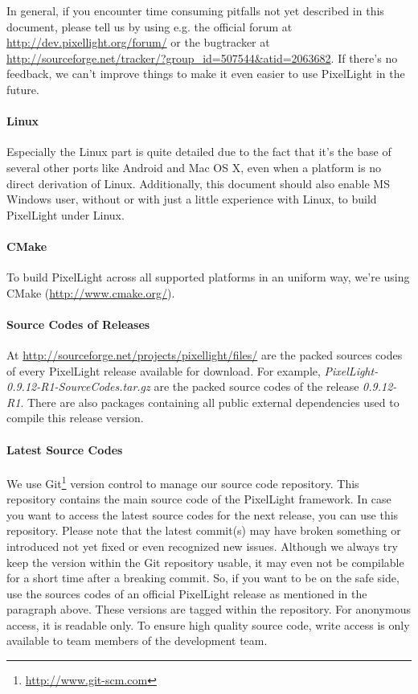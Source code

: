 In general, if you encounter time consuming pitfalls not yet described in this document, please tell us by using e.g. the official forum at \url{http://dev.pixellight.org/forum/} or the bugtracker at \url{http://sourceforge.net/tracker/?group_id=507544&atid=2063682}. If there's no feedback, we can't improve things to make it even easier to use PixelLight in the future.


\paragraph{Linux}
Especially the Linux part is quite detailed due to the fact that it's the base of several other ports like Android and Mac OS X, even when a platform is no direct derivation of Linux. Additionally, this document should also enable \ac{MS} Windows user, without or with just a little experience with Linux, to build PixelLight under Linux.


\paragraph{CMake}
To build PixelLight across all supported platforms in an uniform way, we're using CMake (\url{http://www.cmake.org/}).


\paragraph{Source Codes of Releases}
At \url{http://sourceforge.net/projects/pixellight/files/} are the packed sources codes of every PixelLight release available for download. For example, \emph{PixelLight-0.9.12-R1-SourceCodes.tar.gz} are the packed source codes of the release \emph{0.9.12-R1}. There are also packages containing all public external dependencies used to compile this release version.


\paragraph{Latest Source Codes}
We use Git\footnote{\url{http://www.git-scm.com}} version control to manage our source code repository. This repository contains the main source code of the PixelLight framework. In case you want to access the latest source codes for the next release, you can use this repository. Please note that the latest commit(s) may have broken something or introduced not yet fixed or even recognized new issues. Although we always try keep the version within the Git repository usable, it may even not be compilable for a short time after a breaking commit. So, if you want to be on the safe side, use the sources codes of an official PixelLight release as mentioned in the paragraph above. These versions are tagged within the repository. For anonymous access, it is readable only. To ensure high quality source code, write access is only available to team members of the development team.

